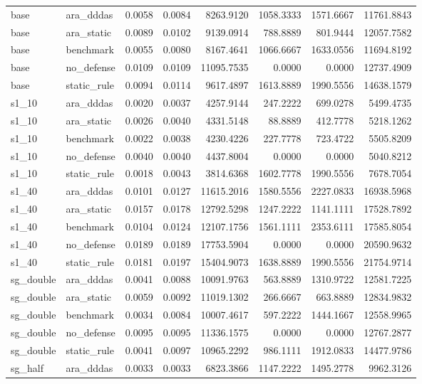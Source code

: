 \begin{tabular}{llrrrrrr}
base & ara_dddas & 0.0058 & 0.0084 & 8263.9120 & 1058.3333 & 1571.6667 & 11761.8843 \\
base & ara_static & 0.0089 & 0.0102 & 9139.0914 & 788.8889 & 801.9444 & 12057.7582 \\
base & benchmark & 0.0055 & 0.0080 & 8167.4641 & 1066.6667 & 1633.0556 & 11694.8192 \\
base & no_defense & 0.0109 & 0.0109 & 11095.7535 & 0.0000 & 0.0000 & 12737.4909 \\
base & static_rule & 0.0094 & 0.0114 & 9617.4897 & 1613.8889 & 1990.5556 & 14638.1579 \\
s1_10 & ara_dddas & 0.0020 & 0.0037 & 4257.9144 & 247.2222 & 699.0278 & 5499.4735 \\
s1_10 & ara_static & 0.0026 & 0.0040 & 4331.5148 & 88.8889 & 412.7778 & 5218.1262 \\
s1_10 & benchmark & 0.0022 & 0.0038 & 4230.4226 & 227.7778 & 723.4722 & 5505.8209 \\
s1_10 & no_defense & 0.0040 & 0.0040 & 4437.8004 & 0.0000 & 0.0000 & 5040.8212 \\
s1_10 & static_rule & 0.0018 & 0.0043 & 3814.6368 & 1602.7778 & 1990.5556 & 7678.7054 \\
s1_40 & ara_dddas & 0.0101 & 0.0127 & 11615.2016 & 1580.5556 & 2227.0833 & 16938.5968 \\
s1_40 & ara_static & 0.0157 & 0.0178 & 12792.5298 & 1247.2222 & 1141.1111 & 17528.7892 \\
s1_40 & benchmark & 0.0104 & 0.0124 & 12107.1756 & 1561.1111 & 2353.6111 & 17585.8054 \\
s1_40 & no_defense & 0.0189 & 0.0189 & 17753.5904 & 0.0000 & 0.0000 & 20590.9632 \\
s1_40 & static_rule & 0.0181 & 0.0197 & 15404.9073 & 1638.8889 & 1990.5556 & 21754.9714 \\
sg_double & ara_dddas & 0.0041 & 0.0088 & 10091.9763 & 563.8889 & 1310.9722 & 12581.7225 \\
sg_double & ara_static & 0.0059 & 0.0092 & 11019.1302 & 266.6667 & 663.8889 & 12834.9832 \\
sg_double & benchmark & 0.0034 & 0.0084 & 10007.4617 & 597.2222 & 1444.1667 & 12558.9965 \\
sg_double & no_defense & 0.0095 & 0.0095 & 11336.1575 & 0.0000 & 0.0000 & 12767.2877 \\
sg_double & static_rule & 0.0041 & 0.0097 & 10965.2292 & 986.1111 & 1912.0833 & 14477.9786 \\
sg_half & ara_dddas & 0.0033 & 0.0033 & 6823.3866 & 1147.2222 & 1495.2778 & 9962.3126 \\

\end{tabular}
